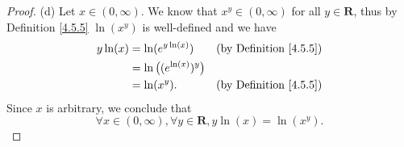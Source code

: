 \begin{proof}{(d)}
    Let \(x \in (0, \infty)\).
    We know that \(x^y \in (0, \infty)\) for all \(y \in \mathbf{R}\), thus by Definition \ref{4.5.5} \(\ln(x^y)\) is well-defined and we have
    \begin{align*}
        y \ln(x) & = \ln(e^{y \ln(x)})             & \text{(by Definition \ref{4.5.5})} \\
                 & = \ln\big((e^{\ln(x)})^{y}\big)                                      \\
                 & = \ln(x^y).                     & \text{(by Definition \ref{4.5.5})}
    \end{align*}
    Since \(x\) is arbitrary, we conclude that
    \[
        \forall x \in (0, \infty), \forall y \in \mathbf{R}, y \ln(x) = \ln(x^y).
    \]
\end{proof}


